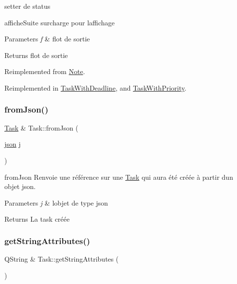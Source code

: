 setter de status 

affiche\+Suite surcharge pour l\textquotesingle{}affichage 
\begin{DoxyParams}{Parameters}
{\em f} & flot de sortie \\
\hline
\end{DoxyParams}
\begin{DoxyReturn}{Returns}
flot de sortie 
\end{DoxyReturn}


Reimplemented from \hyperlink{classNote_ad3c0d7e48ef8244ead577128993a6f1f}{Note}.



Reimplemented in \hyperlink{classTaskWithDeadline_a594623304e3500104c071ebbb95d1670}{Task\+With\+Deadline}, and \hyperlink{classTaskWithPriority_abba0d3458bd4ef1aed57ddd0d0cbe233}{Task\+With\+Priority}.

\mbox{\label{classTask_a9b3bf109c5f117a106f2443cba792dd9}} 
\subsubsection{\texorpdfstring{from\+Json()}{fromJson()}}
{\footnotesize\ttfamily \hyperlink{classTask}{Task} \& Task\+::from\+Json (\begin{DoxyParamCaption}\item[{\hyperlink{classnlohmann_1_1basic__json}{json}}]{j }\end{DoxyParamCaption})\hspace{0.3cm}{\ttfamily [static]}}



from\+Json Renvoie une référence sur une \hyperlink{classTask}{Task} qui aura été créée à partir d\textquotesingle{}un objet json. 


\begin{DoxyParams}{Parameters}
{\em j} & l\textquotesingle{}objet de type json \\
\hline
\end{DoxyParams}
\begin{DoxyReturn}{Returns}
La task créée 
\end{DoxyReturn}
\mbox{\label{classTask_a410f65f8d06198e75d8faec574827726}} 
\subsubsection{\texorpdfstring{get\+String\+Attributes()}{getStringAttributes()}}
{\footnotesize\ttfamily Q\+String \& Task\+::get\+String\+Attributes (\begin{DoxyParamCaption}{ }\end{DoxyParamCaption})\hspace{0.3cm}{\ttfamily [virtual]}}



